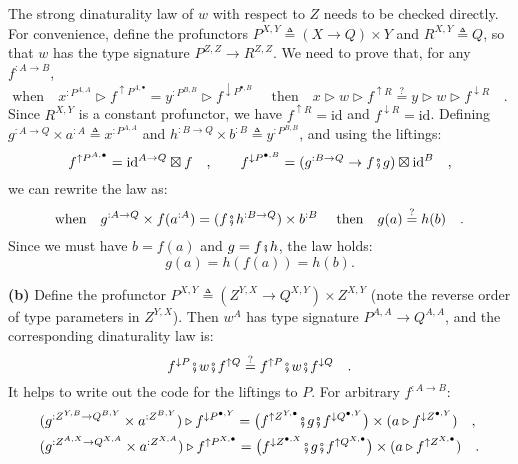 The strong dinaturality law of $w$ with respect to $Z$ needs to
be checked directly. For convenience, define the profunctors $P^{X,Y}\triangleq(X\rightarrow Q)\times Y$
and $R^{X,Y}\triangleq Q$, so that $w$ has the type signature $P^{Z,Z}\rightarrow R^{Z,Z}$.
We need to prove that, for any $f^{:A\rightarrow B}$,
\[
\text{when}\quad x^{:P^{A,A}}\triangleright f^{\uparrow P^{A,\bullet}}=y^{:P^{B,B}}\triangleright f^{\downarrow P^{\bullet,B}}\quad\text{ then}\quad x\triangleright w\triangleright f^{\uparrow R}\overset{?}{=}y\triangleright w\triangleright f^{\downarrow R}\quad.
\]
Since $R^{X,Y}$ is a constant profunctor, we have $f^{\uparrow R}=\text{id}$
and $f^{\downarrow R}=\text{id}$. Defining $g^{:A\rightarrow Q}\times a^{:A}\triangleq x^{:P^{A,A}}$
and $h^{:B\rightarrow Q}\times b^{:B}\triangleq y^{:P^{B,B}}$, and
using the liftings:
\[
f^{\uparrow P^{A,\bullet}}=\text{id}^{A\rightarrow Q}\boxtimes f\quad,\quad\quad f^{\downarrow P^{\bullet,B}}=(g^{:B\rightarrow Q}\rightarrow f\bef g)\boxtimes\text{id}^{B}\quad,
\]
we can rewrite the law as:
\[
\text{when}\quad g^{:A\rightarrow Q}\times f(a^{:A})=(f\bef h^{:B\rightarrow Q})\times b^{:B}\quad\text{ then}\quad g(a)\overset{?}{=}h(b)\quad.
\]
Since we must have $b=f(a)$ and $g=f\bef h$, the law holds:
\[
g(a)=h(f(a))=h(b).
\]

\textbf{(b)} Define the profunctor $P^{X,Y}\triangleq(Z^{Y,X}\rightarrow Q^{X,Y})\times Z^{X,Y}$
(note the reverse order of type parameters in $Z^{Y,X}$). Then $w^{A}$
has type signature $P^{A,A}\rightarrow Q^{A,A}$, and the corresponding
dinaturality law is:
\[
f^{\downarrow P}\bef w\bef f^{\uparrow Q}\overset{?}{=}f^{\uparrow P}\bef w\bef f^{\downarrow Q}\quad.
\]
It helps to write out the code for the liftings to $P$. For arbitrary
$f^{:A\rightarrow B}$:
\begin{align*}
 & (g^{:Z^{Y,B}\rightarrow Q^{B,Y}}\times a^{:Z^{B,Y}})\triangleright f^{\downarrow P^{\bullet,Y}}=\big(f^{\uparrow Z^{Y,\bullet}}\bef g\bef f^{\downarrow Q^{\bullet,Y}}\big)\times(a\triangleright f^{\downarrow Z^{\bullet,Y}})\quad,\\
 & (g^{:Z^{A,X}\rightarrow Q^{X,A}}\times a^{:Z^{X,A}})\triangleright f^{\uparrow P^{X,\bullet}}=\big(f^{\downarrow Z^{\bullet,X}}\bef g\bef f^{\uparrow Q^{X,\bullet}}\big)\times(a\triangleright f^{\uparrow Z^{X,\bullet}})\quad.
\end{align*}

